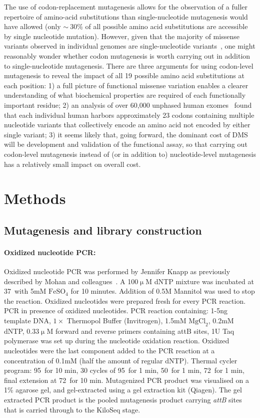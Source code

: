 The use of codon-replacement mutagenesis allows for the observation of a fuller repertoire of amino-acid substitutions than single-nucleotide mutagenesis would have allowed (only $\sim~30\%$ of all possible amino acid substitutions are accessible by single nucleotide mutation).  However, given that the majority of missense variants observed in individual genomes are single-nucleotide variants~\cite{lek_analysis_2016}, one might reasonably wonder whether codon mutagenesis is worth carrying out in addition to single-nucleotide mutagenesis.  There are three arguments for using codon-level mutagenesis to reveal the impact of all 19 possible amino acid substitutions at each position:  1) a full picture of functional missense variation enables a clearer understanding of what biochemical properties are required of each functionally important residue; 2) an analysis of over 60,000 unphased human exomes~\cite{lek_analysis_2016} found that each individual human harbors approximately 23 codons containing multiple nucleotide variants that collectively encode an amino acid not encoded by either single variant; 3) it seems likely that, going forward, the dominant cost of DMS will be development and validation of the functional assay, so that carrying out codon-level mutagenesis instead of (or in addition to) nucleotide-level mutagenesis has a relatively small impact on overall cost.


\section{Methods}

\subsection{Mutagenesis and library construction}

\paragraph{Oxidized nucleotide PCR: } Oxidized nucleotide PCR was performed by Jennifer Knapp as previously described by Mohan and colleagues~\cite{mohan_pcr_2011}. A 100$\upmu$M dNTP mixture was incubated at 37\celsius\ with 5mM $\text{FeSO}_4$ for 10 minutes. Addition of 0.5M Mannitol was used to stop the reaction. Oxidized nucleotides were prepared fresh for every PCR reaction.
PCR in presence of oxidized nucleotides. PCR reaction containing: 1-5ng template DNA, $1\times$ Thermopol Buffer (Invitrogen), 1.5mM $\text{MgCl}_2$, 0.2mM dNTP, 0.33$\upmu$M forward and reverse primers containing attB sites, 1U Taq polymerase was set up during the nucleotide oxidation reaction. Oxidized nucleotides were the last component added to the PCR reaction at a concentration of 0.1mM (half the amount of regular dNTP). Thermal cycler program: 95\celsius\ for 10 min, 30 cycles of 95\celsius\ for 1 min, 50\celsius\ for 1 min, 72\celsius\ for 1 min, final extension at 72\celsius\ for 10 min. Mutagenized PCR product was visualised on a 1\% agarose gel, and gel-extracted using a gel extraction kit (Qiagen). The gel extracted PCR product is the pooled mutagenesis product carrying \textit{attB} sites that is carried through to the KiloSeq stage.

